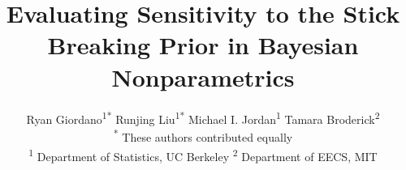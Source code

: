 \documentclass[a0,plainsections]{sciposter}\usepackage[]{graphicx}\usepackage[]{color}
\title{\textcolor{mydarkblue}{Evaluating Sensitivity to the Stick Breaking Prior in Bayesian Nonparametrics
}}
\author{Ryan Giordano\textsuperscript{1*} \quad 
Runjing Liu\textsuperscript{1*} \quad 
Michael I. Jordan\textsuperscript{1} \quad 
Tamara Broderick\textsuperscript{2} \\
{\large\normalfont\textsuperscript{*} These authors contributed equally}\\
 {\large\normalfont\textsuperscript{1} Department of Statistics, UC Berkeley \quad \textsuperscript{2} Department of EECS, MIT}
 }
\begin{document}


\setlength{\parskip}{0.25em}

\maketitle

\vspace{-1in}


\newcommand{\bnpalpha}{2}
\newcommand{\betamean}{0.38}
\newcommand{\betainfo}{0.10}
\newcommand{\gammascale}{0.10}
\newcommand{\gammashape}{10.00}
\newcommand{\bmean}{0}
\newcommand{\binfo}{0.10}
\newcommand{\nboot}{200}
\newcommand{\kapprox}{30}
\newcommand{\nobs}{1000}
\newcommand{\betadim}{7}
\newcommand{\ntime}{14}
\newcommand{\splinedegree}{3}





\end{document}
